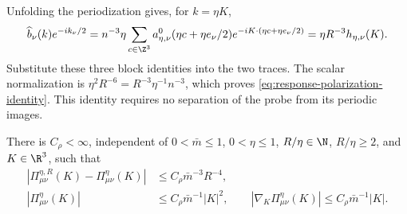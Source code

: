 \documentclass[11pt,letterpaper,reqno]{amsart}
\begin{document}
Unfolding the periodization gives, for $k=\eta K$,
\[
 \widehat b_\nu(k)e^{-ik_\nu/2}
     =n^{-3}\eta\sum_{c\in\Z^3}
          a_{\eta,\nu}^0(\eta c+\eta e_\nu/2)
                            e^{-iK\cdot(\eta c+\eta e_\nu/2)}
     =\eta R^{-3}h_{\eta,\nu}(K).
\]
Substitute these three block identities into the two traces.
The scalar normalization is
$\eta^2R^{-6}=R^{-3}\eta^{-1}n^{-3}$, which proves
\eqref{eq:response-polarization-identity}. This identity
requires no separation of the probe from its periodic images.

\begin{proposition}\label{prop:response-polarization-bounds}
There is $C_\rho<\infty$, independent of $0<\bar m\le1$,
$0<\eta\le1$, $R/\eta\in\N$, $R/\eta\ge2$, and $K\in\R^3$,
such that
\begin{align}
 |\Pi^{\eta,R}_{\mu\nu}(K)-\Pi^\eta_{\mu\nu}(K)|
       &\le C_\rho\bar m^{-3}R^{-4},
                            \label{eq:response-polarization-quadrature}\\
 |\Pi^\eta_{\mu\nu}(K)|&\le C_\rho\bar m^{-1}|K|^2,\qquad
 |\nabla_K\Pi^\eta_{\mu\nu}(K)|
                    \le C_\rho\bar m^{-1}|K|.
                            \label{eq:response-polarization-quadratic}
\end{align}
\end{proposition}
\end{document}
